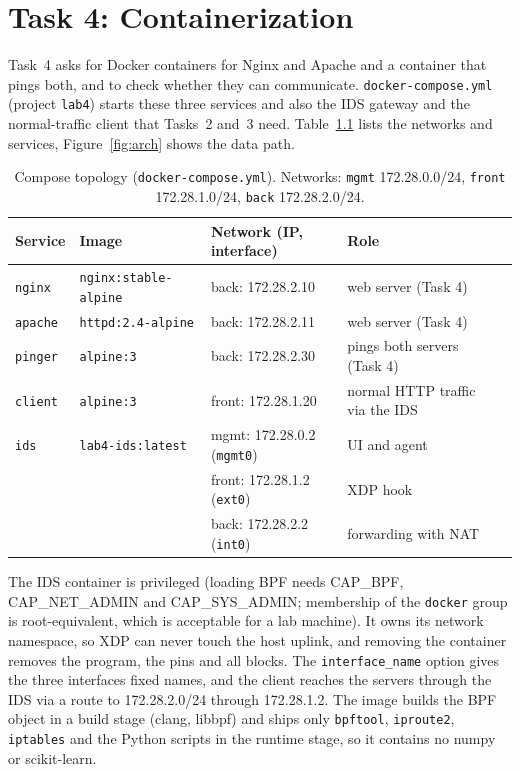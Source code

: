 \chapter{Task 4: Containerization}\label{chap:task4}

Task~4 asks for Docker containers for Nginx and Apache and a container that pings both, and to check whether they can communicate. \texttt{docker-compose.yml} (project \texttt{lab4}) starts these three services and also the IDS gateway and the normal-traffic client that Tasks~2 and~3 need. Table~\ref{tab:topo} lists the networks and services, Figure~\ref{fig:arch} shows the data path.

\begin{table}[htb]
\centering\small
\begin{tabular}{@{}lllll@{}}
\toprule
Service & Image & Network (IP, interface) & Role \\
\midrule
\texttt{nginx} & \texttt{nginx:stable-alpine} & back: 172.28.2.10 & web server (Task 4)\\
\texttt{apache} & \texttt{httpd:2.4-alpine} & back: 172.28.2.11 & web server (Task 4)\\
\texttt{pinger} & \texttt{alpine:3} & back: 172.28.2.30 & pings both servers (Task 4)\\
\texttt{client} & \texttt{alpine:3} & front: 172.28.1.20 & normal HTTP traffic via the IDS\\
\texttt{ids} & \texttt{lab4-ids:latest} & mgmt: 172.28.0.2 (\texttt{mgmt0}) & UI and agent\\
 & & front: 172.28.1.2 (\texttt{ext0}) & XDP hook\\
 & & back: 172.28.2.2 (\texttt{int0}) & forwarding with NAT\\
\bottomrule
\end{tabular}
\caption{Compose topology (\texttt{docker-compose.yml}). Networks: \texttt{mgmt} 172.28.0.0/24, \texttt{front} 172.28.1.0/24, \texttt{back} 172.28.2.0/24.}\label{tab:topo}
\end{table}

The IDS container is privileged (loading BPF needs CAP\_BPF, CAP\_NET\_ADMIN and CAP\_SYS\_ADMIN; membership of the \texttt{docker} group is root-equivalent, which is acceptable for a lab machine). It owns its network namespace, so XDP can never touch the host uplink, and removing the container removes the program, the pins and all blocks. The \texttt{interface\_name} option gives the three interfaces fixed names, and the client reaches the servers through the IDS via a route to 172.28.2.0/24 through 172.28.1.2. The image builds the BPF object in a build stage (clang, libbpf) and ships only \texttt{bpftool}, \texttt{iproute2}, \texttt{iptables} and the Python scripts in the runtime stage, so it contains no numpy or scikit-learn.

